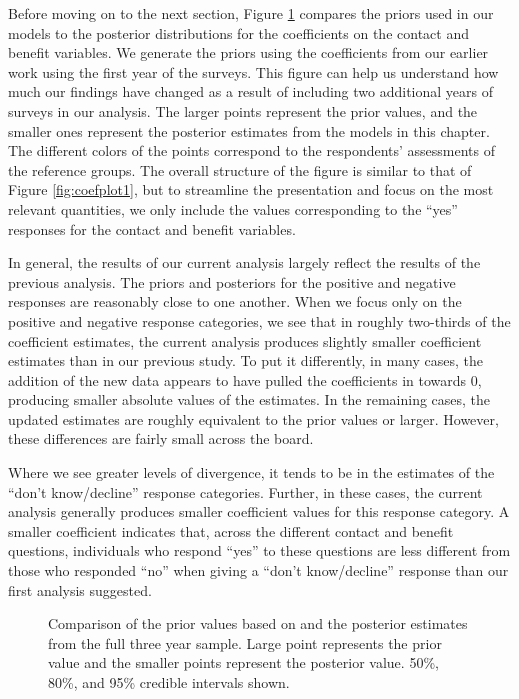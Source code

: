 Before moving on to the next section, Figure \ref{fig:priorcomparison} compares the priors used in our models to the posterior distributions for the coefficients on the contact and benefit variables. We generate the priors using the coefficients from our earlier work using the first year of the surveys.\cite{Allen2020} This figure can help us understand how much our findings have changed as a result of including two additional years of surveys in our analysis. The larger points represent the prior values, and the smaller ones represent the posterior estimates from the models in this chapter. The different colors of the points correspond to the respondents' assessments of the reference groups. The overall structure of the figure is similar to that of Figure \ref{fig:coefplot1}, but to streamline the presentation and focus on the most relevant quantities, we only include the values corresponding to the ``yes'' responses for the contact and benefit variables. 

In general, the results of our current analysis largely reflect the results of the previous analysis. The priors and posteriors for the positive and negative responses are reasonably close to one another. When we focus only on the positive and negative response categories, we see that in roughly two-thirds of the coefficient estimates, the current analysis produces slightly smaller coefficient estimates than in our previous study. To put it differently, in many cases, the addition of the new data appears to have pulled the coefficients in towards 0, producing smaller absolute values of the estimates. In the remaining cases, the updated estimates are roughly equivalent to the prior values or larger. However, these differences are fairly small across the board.

Where we see greater levels of divergence, it tends to be in the estimates of the ``don't know/decline'' response categories. Further, in these cases, the current analysis generally produces smaller coefficient values for this response category. A smaller coefficient indicates that, across the different contact and benefit questions, individuals who respond ``yes'' to these questions are less different from those who responded ``no'' when giving a ``don't know/decline'' response than our first analysis suggested. 


\begin{figure}[t]
	\centering{}
	\caption{Comparison of the prior values based on and the posterior estimates from the full three year sample. Large point represents the prior value and the smaller points represent the posterior value. 50\%, 80\%, and 95\% credible intervals shown.}
	\label{fig:priorcomparison}
\end{figure}%


